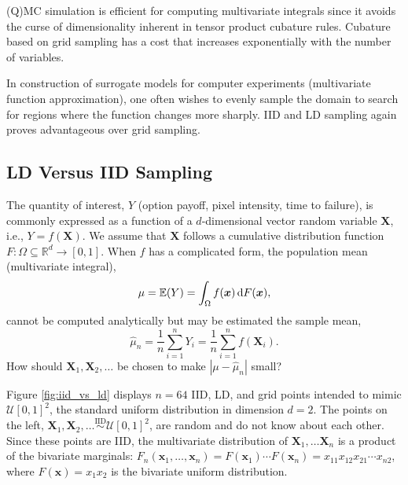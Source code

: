 \documentclass[11pt]{NSFamsart}
\newcommand{\reals}{{\mathbb{R}}}
\newcommand{\bbE}{\mathbb{E}}
\newcommand{\bx}{{\boldsymbol{x}}}
\newcommand{\bX}{{\boldsymbol{X}}}
\def\dif{\textup{d}}
\newcommand{\cx}{{\Omega}}
\newcommand{\calu}{{\mathcal{U}}}
\def\abs#1{\ensuremath{\left \lvert #1 \right \rvert}}
\newcommand{\hmu}{\hat{\mu}}
\newcommand{\IIDSim}{\overset{\text{IID}}{\sim}}
\begin{document}
(Q)MC simulation is efficient for computing multivariate integrals since it avoids the curse of dimensionality inherent in tensor product cubature rules.  Cubature based on grid sampling has a cost that increases exponentially with the number of variables.

In construction of surrogate models for computer experiments (multivariate function approximation), one often wishes to evenly sample the domain to search for regions where the function changes more sharply.  IID and LD sampling again proves advantageous over grid sampling.

\subsection{LD Versus IID Sampling}

The quantity of interest, $Y$ (option payoff, pixel intensity, time to failure), is commonly expressed as a function of a $d$-dimensional vector random variable $\bX$, i.e., $Y = f(\bX)$.  We assume that $\bX$ follows a cumulative distribution function $F:\cx \subseteq \reals^d \to [0,1]$.  When $f$ has a complicated form, the population mean (multivariate integral), 
\begin{equation}
    \mu = \bbE(Y) = \int_{\cx} f(\bx) \, \dif F(\bx),
\end{equation} 
cannot be computed analytically but may be estimated the sample mean,
\begin{equation}
\hmu_n = \frac 1n \sum_{i=1}^n Y_i = \frac 1n  \sum_{i=1}^n f(\bX_i).
\end{equation}
How should $\bX_1, \bX_2, \ldots $ be chosen to make $\abs{\mu - \hmu_n}$ small?

Figure \ref{fig:iid_vs_ld} displays $n=64$ IID, LD, and grid points intended to mimic $\calu[0,1]^2$, the standard uniform distribution in dimension $d=2$.  The points on the left, $\bX_1, \bX_2,  \ldots \IIDSim \calu[0,1]^2$, are random and do not know about each other.  Since these points are IID, the multivariate distribution of $\bX_1, \ldots \bX_n$ is a product of the bivariate marginals:  $F_{n}(\bx_1, \ldots, \bx_n) = F(\bx_1) 
\cdots F(\bx_n) = x_{11}x_{12} x_{21} \cdots x_{n2}$, where $F(\bx)  = x_1x_2$ is the bivariate uniform distribution.
\end{document}
